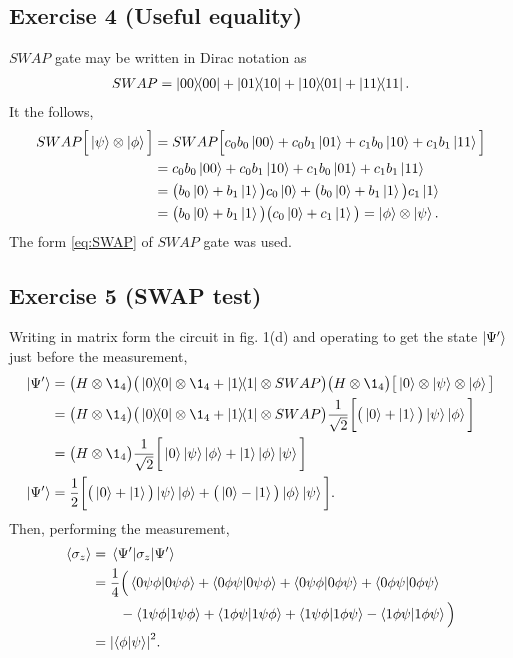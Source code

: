 \subsection{Exercise 4 (Useful equality)}
$SWAP$ gate may be written in Dirac notation as
\begin{align}\label{eq:SWAP}
SWAP=\dyad{00}{00}+\dyad{01}{10}+\dyad{10}{01}+\dyad{11}{11}.
\end{align}
It the follows,
\begin{subequations}
\begin{align}
SWAP\Big[ \ket{\psi	}\otimes \ket{\phi}\Big]&=
	SWAP\Big[ c_0b_0\ket{00}+c_0b_1\ket{01}+c_1b_0\ket{10}+c_1b_1\ket{11} \Big]\\
&=c_0b_0\ket{00}+c_0b_1\ket{10}+c_1b_0\ket{01}+c_1b_1\ket{11}\\
&=\big( b_0\ket{0}+b_1\ket{1} \big)c_0\ket{0}+
	\big( b_0\ket{0}+b_1\ket{1} \big)c_1\ket{1}\\
&=\big( b_0\ket{0}+b_1\ket{1} \big)\big( c_0\ket{0}+c_1\ket{1}\big)
=\ket{\phi}\otimes\ket{\psi}.
\end{align}
\end{subequations}
The form \eqref{eq:SWAP} of $SWAP$ gate was used.

\subsection{Exercise 5 (SWAP test)}\noindent
Writing in matrix form the circuit in fig. 1(d) and operating to get 
the state $\ket{\Psi'}$ just before the measurement,
\begin{subequations}
\begin{align}
\ket{\Psi'}&=\big( H\otimes\1_4 \big)	
	\big( \dyad{0}{0}\otimes\1_4+\dyad{1}{1}\otimes SWAP \big)
		\big(H\otimes\1_4 \big)\big[ \ket{0}\otimes\ket{\psi}\otimes\ket{\phi} \big]\\
&=\big( H\otimes\1_4 \big)	
	\big( \dyad{0}{0}\otimes\1_4+\dyad{1}{1}\otimes SWAP \big)
		\frac{1}{\sqrt{2}}\bigg[ \big(\ket{0}+\ket{1} \big)\ket{\psi}\ket{\phi} \bigg]\\
&=\big( H\otimes\1_4 \big)	
	\frac{1}{\sqrt{2}}\bigg[ \ket{0}\dket{\psi}{\phi}+\ket{1}\dket{\phi}{\psi} \bigg]\\
\ket{\Psi'}&=\frac{1}{2}\bigg[\big( \ket{0}+\ket{1} \big)\dket{\psi}{\phi} +
	\big( \ket{0}-\ket{1} \big)\dket{\phi}{\psi} \bigg].
\end{align}
\end{subequations}
Then, performing the measurement,
\begin{subequations}
\begin{align}
\expval{\sigma_z}&=\matrixel{\Psi'}{\sigma_z}{\Psi'}\\
&=\frac{1}{4}\Big( \braket{0\psi\phi}{0\psi\phi}+\braket{0\phi\psi}{0\psi\phi}
+\braket{0\psi\phi}{0\phi\psi}+\braket{0\phi\psi}{0\phi\psi}\\
&\qquad
 -\braket{1\psi\phi}{1\psi\phi}+\braket{1\phi\psi}{1\psi\phi}+
\braket{1\psi\phi}{1\phi\psi}-\braket{1\phi\psi}{1\phi\psi}
\Big)\\
&=\abs{\braket{\phi}{\psi}}^2.
\end{align}
\end{subequations}